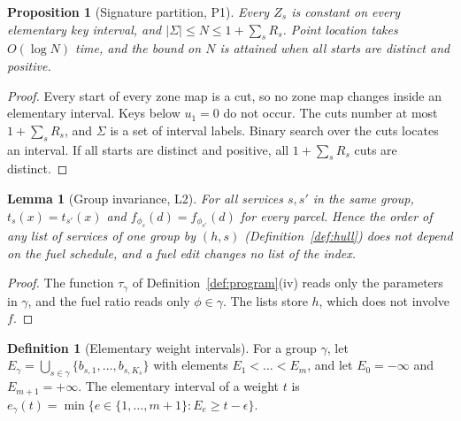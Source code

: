 \documentclass[11pt]{article}
\newtheorem{lemma}[theorem]{Lemma}
\newtheorem{proposition}[theorem]{Proposition}
\theoremstyle{definition}
\newtheorem{definition}[theorem]{Definition}
\theoremstyle{remark}
\begin{document}
\begin{proposition}[Signature partition, P1]\label{prop:P1}
Every $Z_s$ is constant on every elementary key interval, and
$|\Sigma|\le N\le 1+\sum_sR_s$. Point location takes $O(\log N)$ time, and the bound on $N$
is attained when all starts are distinct and positive.
\end{proposition}
\begin{proof}
Every start of every zone map is a cut, so no zone map changes inside an elementary
interval. Keys below $u_1=0$ do not occur. The cuts number at most $1+\sum_sR_s$, and
$\Sigma$ is a set of interval labels. Binary search over the cuts locates an interval. If
all starts are distinct and positive, all $1+\sum_sR_s$ cuts are distinct.
\end{proof}

\begin{lemma}[Group invariance, L2]\label{lem:L2}
For all services $s,s'$ in the same group, $t_s(x)=t_{s'}(x)$ and
$f_{\phi_s}(d)=f_{\phi_{s'}}(d)$ for every parcel. Hence the order of any list of services
of one group by $(h,s)$ (Definition~\ref{def:hull}) does not depend on the fuel schedule,
and a fuel edit changes no list of the index.
\end{lemma}
\begin{proof}
The function $\tau_\gamma$ of Definition~\ref{def:program}(iv) reads only the parameters in
$\gamma$, and the fuel ratio reads only $\phi\in\gamma$. The lists store $h$, which does
not involve $f$.
\end{proof}

\begin{definition}[Elementary weight intervals]\label{def:elem}
For a group $\gamma$, let $E_\gamma=\bigcup_{s\in\gamma}\{b_{s,1},\dots,b_{s,K_s}\}$ with elements
$E_1<\dots<E_m$, and let $E_0=-\infty$ and $E_{m+1}=+\infty$. The elementary interval of a
weight $t$ is $e_\gamma(t)=\min\{e\in\{1,\dots,m+1\}:E_e\ge t-\epsilon\}$.
\end{definition}
\end{document}
